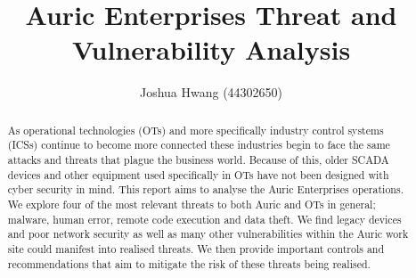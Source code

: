 \documentclass{article}
\title{Auric Enterprises Threat and Vulnerability Analysis}
\author{Joshua Hwang (44302650)}
\begin{document}
\maketitle
\begin{abstract}
    As operational technologies (OTs) and more specifically
    industry control systems (ICSs) continue to become more connected these
    industries begin to face the same attacks and threats
    that plague the business
    world.
    Because of this, older SCADA devices
    and other equipment used specifically in OTs have not been designed with
    cyber security in mind.
    This report aims to analyse the Auric Enterprises operations.
    We explore four of the most relevant threats to both Auric and OTs in
    general; malware, human error, remote code execution and data theft.
    We find
    legacy devices and poor network security as well as many other
    vulnerabilities within the Auric work site could manifest into
    realised threats. We then provide important controls and
    recommendations that aim to mitigate the risk of these threats being
    realised.
\end{abstract}
\end{document}
